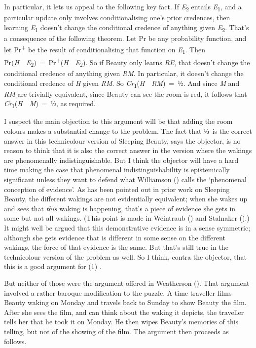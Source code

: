 \documentclass[
  10pt,
  letterpaper,
  DIV=11,
  numbers=noendperiod,
  twoside]{scrartcl}
\begin{document}
In particular, it lets us appeal to the following key fact. If
\emph{E}\textsubscript{2} entails \emph{E}\textsubscript{1}, and a
particular update only involves conditionalising one's prior credences,
then learning \emph{E}\textsubscript{1} doesn't change the conditional
credence of anything given \emph{E}\textsubscript{2}. That's a
consequence of the following theorem. Let Pr be any probability
function, and let Pr\textsuperscript{+} be the result of
conditionalising that function on \emph{E}\textsubscript{1}. Then
Pr(\emph{H}~\textbar~\emph{E}\textsubscript{2})~=~Pr\textsuperscript{+}(\emph{H}~\textbar~\emph{E}\textsubscript{2}).
So if Beauty only learns \emph{RE}, that doesn't change the conditional
credence of anything given \emph{RM}. In particular, it doesn't change
the conditional credence of \emph{H} given \emph{RM}. So
\emph{Cr}\textsubscript{1}(\emph{H}~\textbar~\emph{RM})~=~½. And since
\emph{M} and \emph{RM} are trivially equivalent, since Beauty can see
the room is red, it follows that
\emph{Cr}\textsubscript{1}(\emph{H}~\textbar~\emph{M})~=~½, as required.

I suspect the main objection to this argument will be that adding the
room colours makes a substantial change to the problem. The fact that
⅓~is the correct answer in this technicolour version of Sleeping Beauty,
says the objector, is no reason to think that it is also the correct
answer in the version where the wakings are phenomenally
indistinguishable. But I think the objector will have a hard time making
the case that phenomenal indistinguishability is epistemically
significant unless they want to defend what Williamson
() calls the `phenomenal
conception of evidence'. As has been pointed out in prior work on
Sleeping Beauty, the different wakings are not evidentially equivalent;
when she wakes up and sees that \emph{this} waking is happening, that's
a piece of evidence she gets in some but not all wakings. (This point is
made in Weintraub () and Stalnaker
().) It might well be argued that this
demonstrative evidence is in a sense symmetric; although she gets
evidence that is different in some sense on the different wakings, the
force of that evidence is the same. But that's still true in the
technicolour version of the problem as well. So I think, contra the
objector, that this is a good argument for (1) .

But neither of those were the argument offered in Weatherson
(). That argument involved a rather
baroque modification to the puzzle. A time traveller films Beauty waking
on Monday and travels back to Sunday to show Beauty the film. After she
sees the film, and can think about the waking it depicts, the traveller
tells her that he took it on Monday. He then wipes Beauty's memories of
this telling, but not of the showing of the film. The argument then
proceeds as follows.
\end{document}
